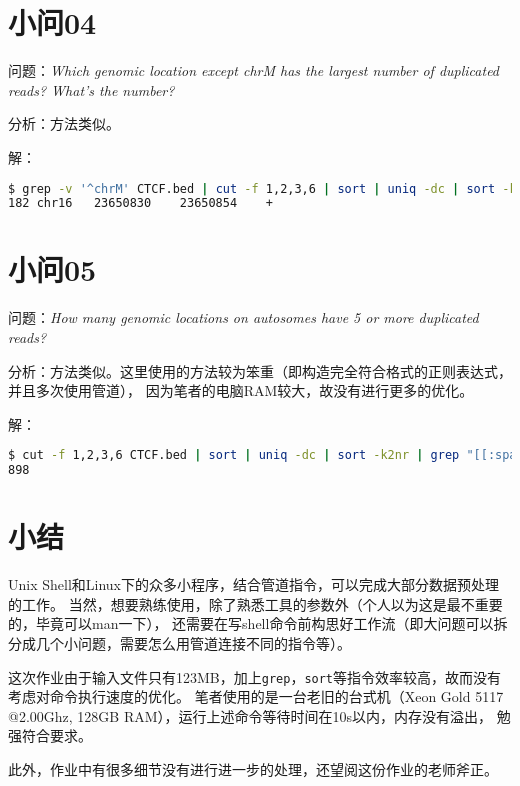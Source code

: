 \documentclass[cn,black,11pt,normal]{elegantnote}
\begin{document}
\section{小问04}
问题：\textit{Which genomic location except chrM 
has the largest number of duplicated reads? What’s the number?}

分析：方法类似。

解：
\begin{lstlisting}[language=bash]
$ grep -v '^chrM' CTCF.bed | cut -f 1,2,3,6 | sort | uniq -dc | sort -k1nr | head -n1
182 chr16	23650830	23650854	+
\end{lstlisting}

\section{小问05}
问题：\textit{How many genomic locations on autosomes have 5 or more duplicated reads?}

分析：方法类似。这里使用的方法较为笨重（即构造完全符合格式的正则表达式，并且多次使用管道），
因为笔者的电脑RAM较大，故没有进行更多的优化。

解：
\begin{lstlisting}[language=bash]
$ cut -f 1,2,3,6 CTCF.bed | sort | uniq -dc | sort -k2nr | grep "[[:space:]][0-9]*[[:space:]]chr[0-9]*[[:space:]][0-9]*[[:space:]][0-9]*[[:space:]][+-]" | grep -v "[[:space:]][0-5][[:space:]]chr[0-9]*[[:space:]][0-9]*[[:space:]][0-9]*[[:space:]][+-]" | wc -l
898  
\end{lstlisting}

\section{小结}
Unix Shell和Linux下的众多小程序，结合管道指令，可以完成大部分数据预处理的工作。
当然，想要熟练使用，除了熟悉工具的参数外（个人以为这是最不重要的，毕竟可以man一下），
还需要在写shell命令前构思好工作流（即大问题可以拆分成几个小问题，需要怎么用管道连接不同的指令等）。

这次作业由于输入文件只有123MB，加上\texttt{grep}，\texttt{sort}等指令效率较高，故而没有考虑对命令执行速度的优化。
笔者使用的是一台老旧的台式机（Xeon Gold 5117 @2.00Ghz, 128GB RAM），运行上述命令等待时间在10s以内，内存没有溢出，
勉强符合要求。

此外，作业中有很多细节没有进行进一步的处理，还望阅这份作业的老师斧正。
\end{document}

